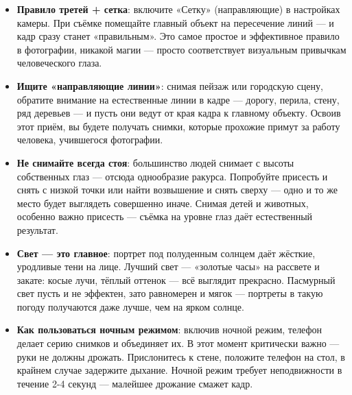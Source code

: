 \begin{itemize}
  \item \textbf{Правило третей + сетка}: включите «Сетку» (направляющие) в настройках камеры. При съёмке помещайте главный объект на пересечение линий — и кадр сразу станет «правильным». Это самое простое и эффективное правило в фотографии, никакой магии — просто соответствует визуальным привычкам человеческого глаза.
  \item \textbf{Ищите «направляющие линии»}: снимая пейзаж или городскую сцену, обратите внимание на естественные линии в кадре — дорогу, перила, стену, ряд деревьев — и пусть они ведут от края кадра к главному объекту. Освоив этот приём, вы будете получать снимки, которые прохожие примут за работу человека, учившегося фотографии.
  \item \textbf{Не снимайте всегда стоя}: большинство людей снимает с высоты собственных глаз — отсюда однообразие ракурса. Попробуйте присесть и снять с низкой точки или найти возвышение и снять сверху — одно и то же место будет выглядеть совершенно иначе. Снимая детей и животных, особенно важно присесть — съёмка на уровне глаз даёт естественный результат.
  \item \textbf{Свет — это главное}: портрет под полуденным солнцем даёт жёсткие, уродливые тени на лице. Лучший свет — «золотые часы» на рассвете и закате: косые лучи, тёплый оттенок — всё выглядит прекрасно. Пасмурный свет пусть и не эффектен, зато равномерен и мягок — портреты в такую погоду получаются даже лучше, чем на ярком солнце.
  \item \textbf{Как пользоваться ночным режимом}: включив ночной режим, телефон делает серию снимков и объединяет их. В этот момент критически важно — руки не должны дрожать. Прислонитесь к стене, положите телефон на стол, в крайнем случае задержите дыхание. Ночной режим требует неподвижности в течение 2-4 секунд — малейшее дрожание смажет кадр.
\end{itemize}


